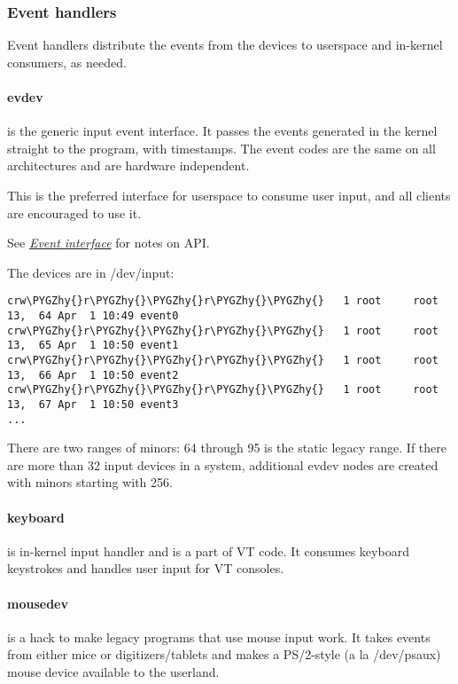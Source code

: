\documentclass[a4paper,8pt,english]{sphinxmanual}
\def\PYGZhy{\char`\-}
\begin{document}
\subsubsection{Event handlers}
\label{input/input:id1}
Event handlers distribute the events from the devices to userspace and
in-kernel consumers, as needed.


\paragraph{evdev}
\label{input/input:evdev}
 is the generic input event interface. It passes the events
generated in the kernel straight to the program, with timestamps. The
event codes are the same on all architectures and are hardware
independent.

This is the preferred interface for userspace to consume user
input, and all clients are encouraged to use it.

See {\hyperref[input/input:event\string-interface]{\emph{Event interface}}} for notes on API.

The devices are in /dev/input:

\begin{Verbatim}[commandchars=\\\{\}]
crw\PYGZhy{}r\PYGZhy{}\PYGZhy{}r\PYGZhy{}\PYGZhy{}   1 root     root      13,  64 Apr  1 10:49 event0
crw\PYGZhy{}r\PYGZhy{}\PYGZhy{}r\PYGZhy{}\PYGZhy{}   1 root     root      13,  65 Apr  1 10:50 event1
crw\PYGZhy{}r\PYGZhy{}\PYGZhy{}r\PYGZhy{}\PYGZhy{}   1 root     root      13,  66 Apr  1 10:50 event2
crw\PYGZhy{}r\PYGZhy{}\PYGZhy{}r\PYGZhy{}\PYGZhy{}   1 root     root      13,  67 Apr  1 10:50 event3
...
\end{Verbatim}

There are two ranges of minors: 64 through 95 is the static legacy
range. If there are more than 32 input devices in a system, additional
evdev nodes are created with minors starting with 256.


\paragraph{keyboard}
\label{input/input:keyboard}
 is in-kernel input handler and is a part of VT code. It
consumes keyboard keystrokes and handles user input for VT consoles.


\paragraph{mousedev}
\label{input/input:mousedev}
 is a hack to make legacy programs that use mouse input
work. It takes events from either mice or digitizers/tablets and makes
a PS/2-style (a la /dev/psaux) mouse device available to the
userland.
\end{document}
